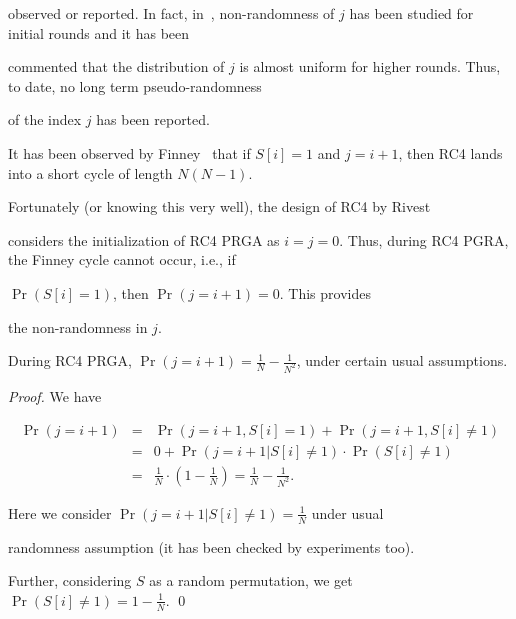 \documentclass{llncs}
\begin{document}
observed or reported. In fact, in~\cite[Section 3.4]{joc}, non-randomness of $j$ has been studied for initial rounds and it has been

commented that the distribution of $j$ is almost uniform for higher rounds. Thus, to date, no long term pseudo-randomness 

of the index $j$ has been reported.



It has been observed by Finney~\cite{finney} that if $S[i] = 1$ and $j = i+1$, then RC4 lands into a short cycle of length $N(N-1)$.

Fortunately (or knowing this very well), the design of RC4 by Rivest

considers the initialization of RC4 PRGA as $i = j = 0$. Thus, during RC4 PGRA, the Finney cycle cannot occur, i.e., if

$\Pr(S[i] = 1)$, then $\Pr(j = i+1) = 0$. This provides

the non-randomness in $j$.



\begin{theorem}

\label{th1}

During RC4 PRGA, $\Pr(j = i+1) = \frac{1}{N} - \frac{1}{N^2}$, under certain usual assumptions.

\end{theorem} 

\begin{proof}

We have

\begin{eqnarray*}

\Pr(j = i+1) & = & \Pr(j = i+1, S[i] = 1) + \Pr(j = i+1, S[i] \neq 1)\\

             & = & 0 + \Pr(j = i+1 | S[i] \neq 1) \cdot \Pr(S[i] \neq 1)\\

             & = & \frac{1}{N} \cdot (1 - \frac{1}{N}) = \frac{1}{N} - \frac{1}{N^2}.

\end{eqnarray*} 

Here we consider $\Pr(j = i+1 | S[i] \neq 1) = \frac{1}{N}$ under usual 

randomness assumption (it has been checked by experiments too). 

Further, considering $S$ as a random permutation, we get $\Pr(S[i] \neq 1) = 1 - \frac{1}{N}$. \qed

\end{proof}
\end{document}
